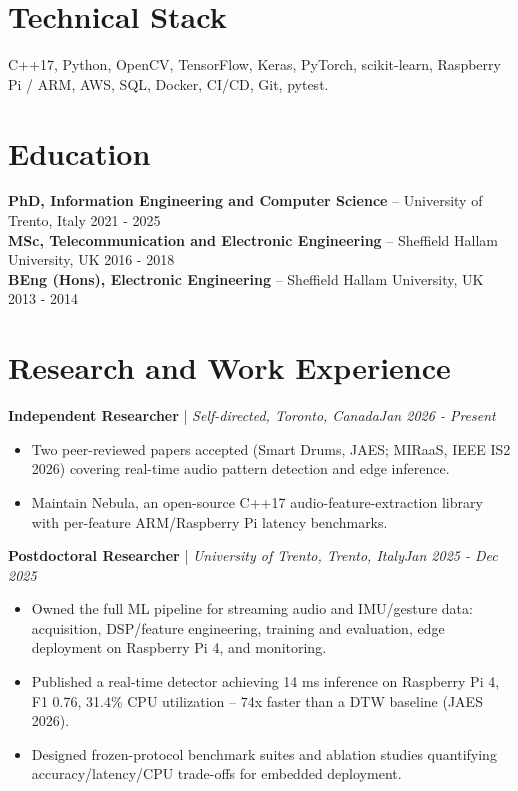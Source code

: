 \documentclass[11pt]{article}
\newenvironment{cvrole}[5]{%
  \par\noindent\textbf{\large #1} | \textit{\small #2, #3}\hfill \textit{\small #4 - #5}\par
  \begin{itemize}[leftmargin=2em, itemsep=-0.3em, topsep=-0.5em]%
}{%
  \end{itemize}\par\noindent\mbox{}\par\vspace{0.1em}%
}
\begin{document}
\section*{Technical Stack}
C++17, Python, OpenCV, TensorFlow, Keras, PyTorch, scikit-learn, Raspberry Pi / ARM, AWS, SQL, Docker, CI/CD, Git, pytest.

\section*{Education}
\noindent\textbf{PhD, Information Engineering and Computer Science} -- University of Trento, Italy \hfill 2021 - 2025 \\
\noindent\textbf{MSc, Telecommunication and Electronic Engineering} -- Sheffield Hallam University, UK \hfill 2016 - 2018 \\
\noindent\textbf{BEng (Hons), Electronic Engineering} -- Sheffield Hallam University, UK \hfill 2013 - 2014

\section*{Research and Work Experience}

\begin{cvrole}{Independent Researcher}{Self-directed}{Toronto, Canada}{Jan 2026}{Present}
\item Two peer-reviewed papers accepted (Smart Drums, JAES; MIRaaS, IEEE IS2 2026) covering real-time audio pattern detection and edge inference.
\item Maintain Nebula, an open-source C++17 audio-feature-extraction library with per-feature ARM/Raspberry Pi latency benchmarks.
\end{cvrole}

\begin{cvrole}{Postdoctoral Researcher}{University of Trento}{Trento, Italy}{Jan 2025}{Dec 2025}
\item Owned the full ML pipeline for streaming audio and IMU/gesture data: acquisition, DSP/feature engineering, training and evaluation, edge deployment on Raspberry Pi 4, and monitoring.
\item Published a real-time detector achieving 14 ms inference on Raspberry Pi 4, F1 0.76, 31.4\% CPU utilization -- 74x faster than a DTW baseline (JAES 2026).
\item Designed frozen-protocol benchmark suites and ablation studies quantifying accuracy/latency/CPU trade-offs for embedded deployment.
\end{cvrole}
\end{document}

